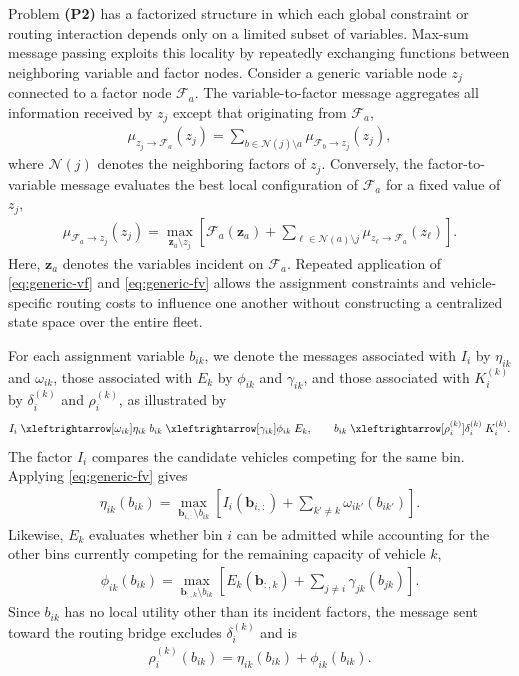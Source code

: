 Problem \textbf{(P2)} has a factorized structure in which each global constraint or routing interaction depends only on a limited subset of variables. Max-sum message passing exploits this locality by repeatedly exchanging functions between neighboring variable and factor nodes. Consider a generic variable node $z_j$ connected to a factor node $\mathcal{F}_a$. The variable-to-factor message aggregates all information received by $z_j$ except that originating from $\mathcal{F}_a$,
\begin{align}
    \mu_{z_j\rightarrow\mathcal{F}_a}(z_j)
    =\sum_{b\in\mathcal{N}(j)\setminus a}
    \mu_{\mathcal{F}_b\rightarrow z_j}(z_j),
    \label{eq:generic-vf}
\end{align}
where $\mathcal{N}(j)$ denotes the neighboring factors of $z_j$. Conversely, the factor-to-variable message evaluates the best local configuration of $\mathcal{F}_a$ for a fixed value of $z_j$,
\begin{align}
    \mu_{\mathcal{F}_a\rightarrow z_j}(z_j)
    =\max_{\mathbf z_a\setminus z_j}
    \left[
    \mathcal{F}_a(\mathbf z_a)
    +\sum_{\ell\in\mathcal{N}(a)\setminus j}
    \mu_{z_\ell\rightarrow\mathcal{F}_a}(z_\ell)
    \right].
    \label{eq:generic-fv}
\end{align}
Here, $\mathbf z_a$ denotes the variables incident on $\mathcal{F}_a$. Repeated application of \eqref{eq:generic-vf} and \eqref{eq:generic-fv} allows the assignment constraints and vehicle-specific routing costs to influence one another without constructing a centralized state space over the entire fleet.

For each assignment variable $b_{ik}$, we denote the messages associated with $I_i$ by $\eta_{ik}$ and $\omega_{ik}$, those associated with $E_k$ by $\phi_{ik}$ and $\gamma_{ik}$, and those associated with $K_i^{(k)}$ by $\delta_i^{(k)}$ and $\rho_i^{(k)}$, as illustrated by
\[
I_i
\;\xleftrightarrow[\omega_{ik}]{\eta_{ik}}\;
b_{ik}
\;\xleftrightarrow[\gamma_{ik}]{\phi_{ik}}\;
E_k,
\qquad
b_{ik}
\;\xleftrightarrow[\rho_i^{(k)}]{\delta_i^{(k)}}\;
K_i^{(k)}.
\]
The factor $I_i$ compares the candidate vehicles competing for the same bin. Applying \eqref{eq:generic-fv} gives
\begin{align}
    \eta_{ik}(b_{ik})
    =\max_{\mathbf b_{i,:}\setminus b_{ik}}
    \left[
    I_i(\mathbf b_{i,:})
    +\sum_{k'\neq k}\omega_{ik'}(b_{ik'})
    \right].
    \label{eq:eta-full}
\end{align}
Likewise, $E_k$ evaluates whether bin $i$ can be admitted while accounting for the other bins currently competing for the remaining capacity of vehicle $k$,
\begin{align}
    \phi_{ik}(b_{ik})
    =\max_{\mathbf b_{:,k}\setminus b_{ik}}
    \left[
    E_k(\mathbf b_{:,k})
    +\sum_{j\neq i}\gamma_{jk}(b_{jk})
    \right].
    \label{eq:phi-full}
\end{align}
Since $b_{ik}$ has no local utility other than its incident factors, the message sent toward the routing bridge excludes $\delta_i^{(k)}$ and is
\begin{align}
    \rho_i^{(k)}(b_{ik})=\eta_{ik}(b_{ik})+\phi_{ik}(b_{ik}).
    \label{eq:rho-full}
\end{align}

